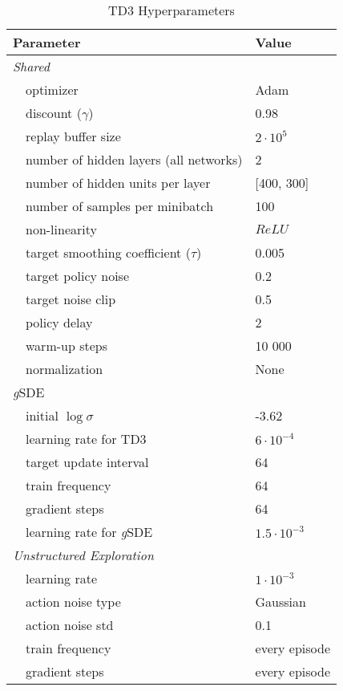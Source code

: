 \documentclass{article}
\newcommand{\ourSDE}{\textit{g}\textsc{SDE}\xspace}
\newcommand{\tddd}{\textsc{TD3}\xspace}
\begin{document}
\begin{table}[h]
\renewcommand{\arraystretch}{1.1}
\centering
\caption{\tddd Hyperparameters}
\label{tab:td3_shared_params}
\vspace{1mm}
  \begin{tabular}{@{}l l| l@{}}
    \toprule
    \multicolumn{2}{l|}{Parameter} &  Value\\
    \midrule
    \multicolumn{2}{l|}{\textit{Shared}}& \\
    & optimizer & Adam~\citep{kingma2014adam}\\
    & discount ($\gamma$) &  0.98\\
    & replay buffer size & $2 \cdot 10^{5}$\\
    & number of hidden layers (all networks) & 2\\
    & number of hidden units per layer & [400, 300]\\
    & number of samples per minibatch & 100\\
    & non-linearity & $ReLU$\\
    & target smoothing coefficient ($\tau$)& 0.005\\
    & target policy noise & 0.2 \\
    & target noise clip & 0.5 \\
    & policy delay & 2\\
    & warm-up steps & 10 000\\
    & normalization & None\\
    \midrule
    \multicolumn{2}{l|}{\ourSDE}& \\
    & initial $\log \sigma$ & -3.62\\
    & learning rate for \tddd & $6 \cdot 10^{-4}$\\
    & target update interval & 64\\
    & train frequency & 64\\
    & gradient steps & 64\\
    & learning rate for \ourSDE & $1.5 \cdot 10^{-3}$\\
    \midrule
    \multicolumn{2}{l|}{\textit{Unstructured Exploration}}& \\
    & learning rate & $1 \cdot 10^{-3}$\\
    & action noise type & Gaussian\\
    & action noise std & 0.1 \\
    & train frequency & every episode\\
    & gradient steps & every episode\\
    \bottomrule
  \end{tabular}
\end{table}
\end{document}
